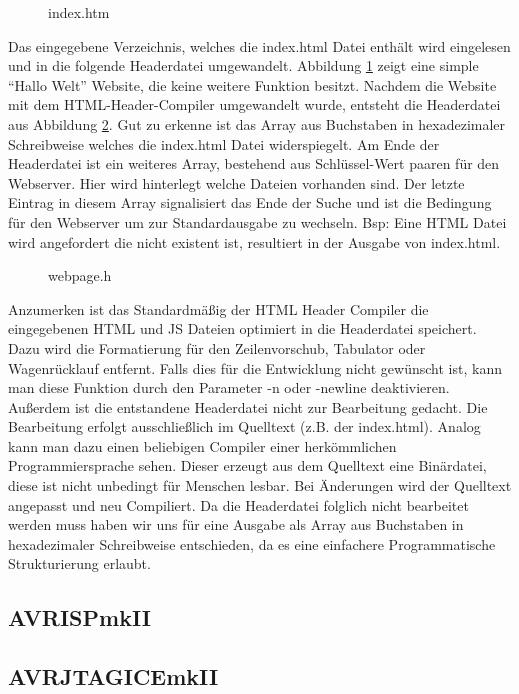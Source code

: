\begin{figure}[H]

\caption{index.htm}
\label{HHC.input}
\end{figure}

Das eingegebene Verzeichnis, welches die \textrm{index.html} Datei enthält wird
eingelesen und in die folgende Headerdatei umgewandelt.
Abbildung \ref{HHC.input} zeigt eine simple "`Hallo Welt"' Website, die keine
weitere Funktion besitzt. Nachdem die Website mit dem HTML-Header-Compiler
umgewandelt wurde, entsteht die Headerdatei aus Abbildung \ref{HHC.output}. Gut
zu erkenne ist das Array aus Buchstaben in hexadezimaler Schreibweise welches die
index.html Datei widerspiegelt.
Am Ende der Headerdatei ist ein weiteres Array, bestehend aus Schlüssel-Wert
paaren für den Webserver. Hier wird hinterlegt welche Dateien vorhanden sind.
Der letzte Eintrag in diesem Array signalisiert das Ende der Suche und ist die
Bedingung für den Webserver um zur Standardausgabe zu wechseln. Bsp: Eine HTML
Datei wird angefordert die nicht existent ist, resultiert in der Ausgabe von
index.html.

\begin{figure}[H]

\caption{webpage.h}
\label{HHC.output}
\end{figure}

Anzumerken ist das Standardmäßig der HTML Header Compiler die eingegebenen HTML
und JS Dateien optimiert in die Headerdatei speichert. Dazu wird die
Formatierung für den Zeilenvorschub, Tabulator oder Wagenrücklauf entfernt.
Falls dies für die Entwicklung nicht gewünscht ist, kann man diese Funktion
durch den Parameter \textrm{-n oder -newline} deaktivieren.
Außerdem ist die entstandene Headerdatei nicht zur Bearbeitung gedacht. Die
Bearbeitung erfolgt ausschließlich im Quelltext (z.B. der index.html). Analog
kann man dazu einen beliebigen Compiler einer herkömmlichen Programmiersprache sehen. Dieser
erzeugt aus dem Quelltext eine Binärdatei, diese ist nicht unbedingt
für Menschen lesbar. Bei Änderungen wird der Quelltext angepasst und neu
Compiliert. Da die Headerdatei folglich nicht bearbeitet werden muss haben wir
uns für eine Ausgabe als Array aus Buchstaben in hexadezimaler Schreibweise
entschieden, da es eine einfachere Programmatische Strukturierung erlaubt.

\subsection{AVRISPmkII}


\subsection{AVRJTAGICEmkII}


